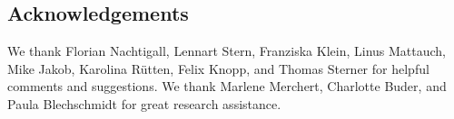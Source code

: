 \documentclass[12pt, a4paper]{article}
\begin{document}
\subsection{Acknowledgements} \label{acknowledgements}

We thank Florian Nachtigall, Lennart Stern, Franziska Klein, Linus Mattauch, Mike Jakob, Karolina Rütten, Felix Knopp, and Thomas Sterner for helpful comments and suggestions. 
We thank Marlene Merchert, Charlotte Buder, and Paula Blechschmidt for great research assistance. 

\end{document}
